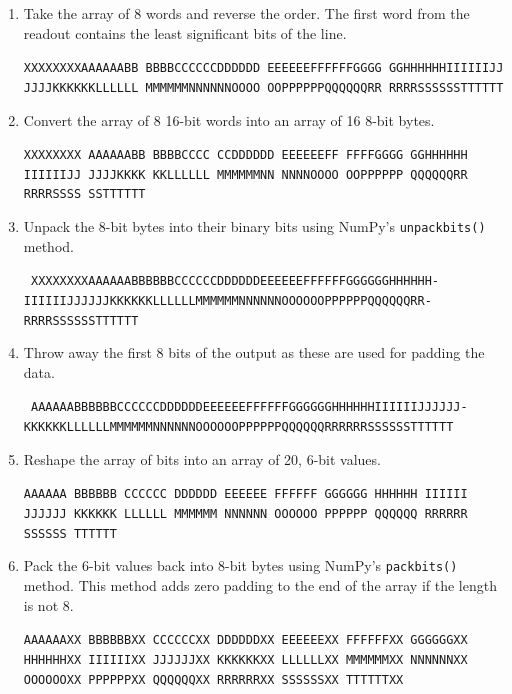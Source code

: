 \begin{enumerate}
\begin{enumerate}
        \item Take the array of 8 words and reverse the order. The first word from the readout contains the least significant bits of the line. \\ 
        {\raggedright
        \texttt{XXXXXXXXAAAAAABB BBBBCCCCCCDDDDDD EEEEEEFFFFFFGGGG GGHHHHHHIIIIIIJJ JJJJKKKKKKLLLLLL MMMMMMNNNNNNOOOO OOPPPPPPQQQQQQRR RRRRSSSSSSTTTTTT}
        \par}
        \item Convert the array of 8 16-bit words into an array of 16 8-bit bytes. \\
        {\raggedright
        \texttt{XXXXXXXX AAAAAABB BBBBCCCC CCDDDDDD EEEEEEFF FFFFGGGG GGHHHHHH IIIIIIJJ JJJJKKKK KKLLLLLL MMMMMMNN NNNNOOOO OOPPPPPP QQQQQQRR RRRRSSSS SSTTTTTT}  
        \par}
        \item Unpack the 8-bit bytes into their binary bits using NumPy's \texttt{unpackbits()} method. \\
        {\raggedright
        \texttt{
            XXXXXXXXAAAAAABBBBBBCCCCCCDDDDDDEEEEEEFFFFFFGGGGGGHHHHHH-
            IIIIIIJJJJJJKKKKKKLLLLLLMMMMMMNNNNNNOOOOOOPPPPPPQQQQQQRR-
            RRRRSSSSSSTTTTTT
            }
        \par}
        \item Throw away the first 8 bits of the output as these are used for padding the data.\\
        {\raggedright
        \texttt{
            AAAAAABBBBBBCCCCCCDDDDDDEEEEEEFFFFFFGGGGGGHHHHHHIIIIIIJJJJJJ-
            KKKKKKLLLLLLMMMMMMNNNNNNOOOOOOPPPPPPQQQQQQRRRRRRSSSSSSTTTTTT}
        \par}
        \item Reshape the array of bits into an array of 20, 6-bit values. \\
        {\raggedright
        \texttt{AAAAAA BBBBBB CCCCCC DDDDDD EEEEEE FFFFFF GGGGGG HHHHHH IIIIII JJJJJJ KKKKKK LLLLLL MMMMMM NNNNNN OOOOOO PPPPPP QQQQQQ RRRRRR SSSSSS TTTTTT}
        \par}
        \item Pack the 6-bit values back into 8-bit bytes using NumPy's \texttt{packbits()} method. This method adds zero padding to the end of the array if the length is not 8. \\
        {\raggedright
        \texttt{AAAAAAXX BBBBBBXX CCCCCCXX DDDDDDXX EEEEEEXX FFFFFFXX GGGGGGXX HHHHHHXX IIIIIIXX JJJJJJXX KKKKKKXX LLLLLLXX MMMMMMXX NNNNNNXX OOOOOOXX PPPPPPXX QQQQQQXX RRRRRRXX SSSSSSXX TTTTTTXX}        
}
\end{enumerate}
\end{enumerate}
